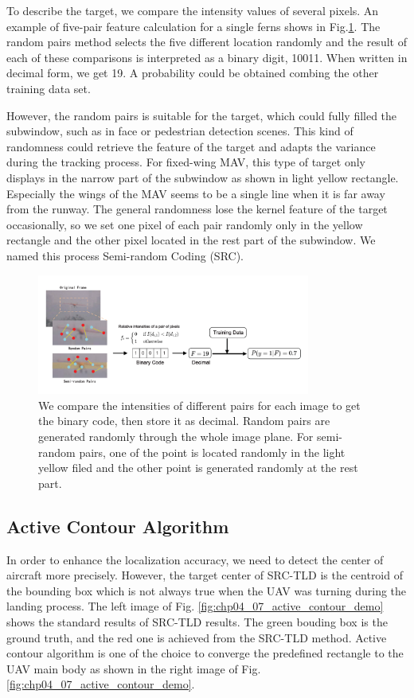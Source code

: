 To describe the target, we compare the intensity values of several pixels.  An example of five-pair feature calculation for a single ferns shows in Fig.\ref{fig:01_TLD_Code}. The random pairs method selects the five different location randomly and the result of each of these comparisons is interpreted as a binary digit, 10011. When written in decimal form, we get 19. A probability could be obtained combing the other training data set.

However, the random pairs is suitable for the target, which could fully filled the subwindow, such as in face or pedestrian detection scenes. This kind of randomness could retrieve the feature of the target and adapts the variance during the tracking process. For fixed-wing MAV, this type of target only displays in the narrow part of the subwindow as shown in light yellow rectangle. Especially the wings of the MAV seems to be a single line when it is far away from the runway. The general randomness lose the kernel feature of the target occasionally, so we set one pixel of each pair randomly only in the yellow rectangle and the other pixel located in the rest part of the subwindow.  We named this process Semi-random Coding (SRC). 

\begin{figure}[!th]
	\centering
	\includegraphics[width=0.8\textwidth]{Figs/01_TLD_Code.pdf}
	\caption{ We compare the intensities of different pairs for each image to get the binary code, then store it as decimal. Random pairs are generated randomly through the whole image plane. For semi-random pairs, one of the point is located randomly in the light yellow ﬁled and the other point is generated randomly at the rest part.}
	\label{fig:01_TLD_Code}    
\end{figure}


\subsection{Active Contour Algorithm}
In order to enhance the localization accuracy, we need to detect the center of aircraft more precisely. However, the target center of SRC-TLD is the centroid of the bounding box which is not always true when the UAV was turning during the landing process. The left image of Fig. \ref{fig:chp04_07_active_contour_demo} shows the standard results of SRC-TLD results. The green bouding box is the ground truth, and the red one is achieved from the SRC-TLD method. Active contour algorithm is one of the choice to converge the predefined rectangle to the UAV main body as shown in the right image of Fig. \ref{fig:chp04_07_active_contour_demo}.

